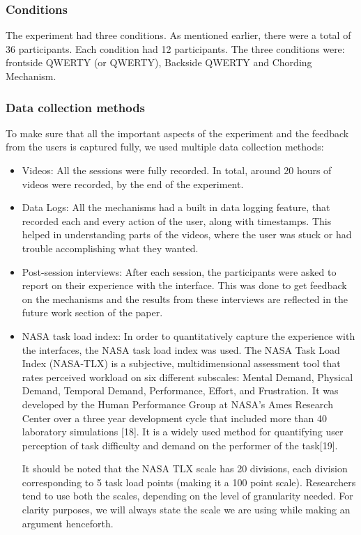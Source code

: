 \subsubsection{Conditions}

The experiment had three conditions. As mentioned earlier, there were
a total of 36 participants. Each condition had 12 participants. The
three conditions were: frontside QWERTY (or QWERTY), Backside QWERTY and Chording Mechanism.

\subsubsection{Data collection methods}

To make sure that all the important aspects of the experiment and the
feedback from the users is captured fully, we used multiple data
collection methods:

\begin{itemize}
\item Videos: All the sessions were fully recorded. In total, around
  20 hours of videos were recorded, by the end of the experiment.
\item Data Logs: All the mechanisms had a built in data logging
  feature, that recorded each and every action of the user, along with
  timestamps. This helped in understanding parts of the videos, where
  the user was stuck or had trouble accomplishing what they wanted.
\item Post-session interviews: After each session, the participants
  were asked to report on their experience with the interface. This was done to get feedback on the mechanisms and the results from these interviews are reflected in the future work section of the paper. 

\item NASA task load index: In order to quantitatively capture the
  experience with the interfaces, the NASA task load index was
  used. The NASA Task Load Index (NASA-TLX) is a subjective,
  multidimensional assessment tool that rates perceived workload on
  six different subscales: Mental Demand, Physical Demand, Temporal
  Demand, Performance, Effort, and Frustration. It was developed by
  the Human Performance Group at NASA's Ames Research Center over a
  three year development cycle that included more than 40 laboratory
  simulations [18]. It is a widely used method for quantifying user
  perception of task difficulty and demand on the performer of the
  task[19].
  
  It should be noted that the NASA TLX scale has 20 divisions, each
  division corresponding to 5 task load points (making it a 100 point
  scale). Researchers tend to use both the scales, depending on the
  level of granularity needed. For clarity purposes, we will always
  state the scale we are using while making an argument henceforth.

\end{itemize}
